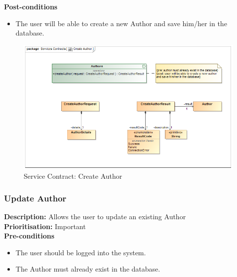 \documentclass[a4paper]{article}
\begin{document}
	\textbf{Post-conditions}
	 \begin{itemize}
		\item The user will be able to create a new Author and save him/her in the database.
	\end{itemize}
	
	    	\begin{figure}[H]
	    		\centering
	    		\includegraphics[width=\textwidth]{5.1.15.Create.Author.Services.Contract.png}
	    		\caption{Service Contract: Create Author}
	    	\end{figure}
	
	\pagebreak
	\subsubsection{Update Author}
	\textbf{Description:} Allows the user to update an existing Author\\
	\textbf{Prioritisation:} Important\\
	
	\textbf{Pre-conditions}
	 \begin{itemize}
		\item The user should be logged into the system.
		\item The Author must already exist in the database.
	\end{itemize}
	
\end{document}
